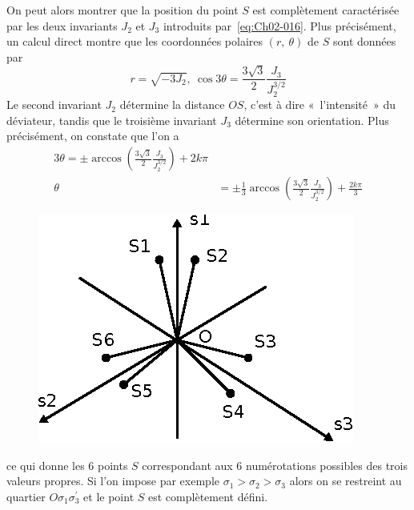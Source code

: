 On peut alors montrer que la position du point $S$ est complètement caractérisée par les deux invariants $J_2$ et $J_3$ introduits par~\eqref{eq:Ch02-016}.
Plus précisément, un calcul direct montre que les coordonnées polaires $\left( r,\ \theta \right)$ de $S$ sont données par 
\begin{equation}
    r = \sqrt{-3J_2},\ \cos 3 \theta = \frac{3\sqrt{3}}{2}\frac{J_3}{J_2^{3/2}}
    \label{eq:Ch02-029}
\end{equation}
Le second invariant $J_2$ détermine la distance $OS$, c'est à dire «~l'intensité~» du déviateur, tandis que le troisième invariant $J_3$ détermine son orientation. 
Plus précisément, on constate que l'on a 
\begin{align}
    3\theta = \pm \arccos \left( \frac{3\sqrt{3}}{2} \frac{J_3}{J_2^{3/2}} \right) + 2 k \pi\nonumber\\
    \theta &= \pm \frac{1}{3}\arccos \left( \frac{3\sqrt{3}}{2} \frac{J_3}{J_2^{3/2}} \right) + \frac{2 k \pi}{3}
    \label{eq:Ch02-030}
\end{align}
\begin{figure}
    \begin{center}
        \includegraphics{../images/T1_Ch02-0014}
    \end{center}
\end{figure}
ce qui donne les 6 points $S$ correspondant aux 6 numérotations possibles des trois valeurs propres. 
Si l'on impose par exemple $\sigma_1 > \sigma_2 > \sigma_3$ alors on se restreint au quartier $O\sigma_1\sigma_3^{\prime}$ et le point $S$ est complètement défini. 

